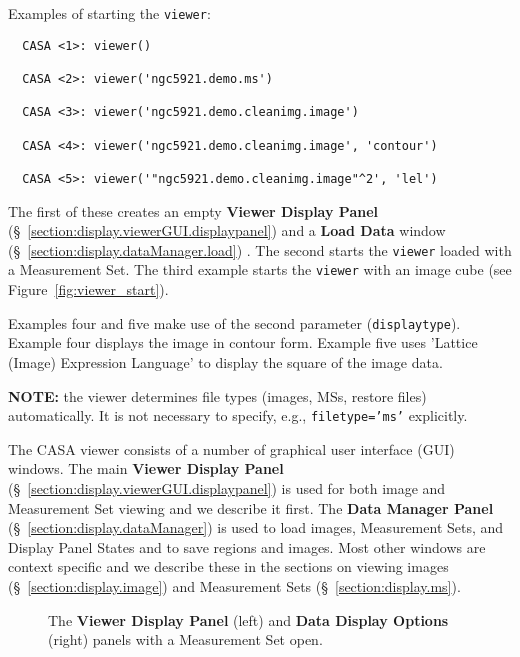 Examples of starting the {\tt viewer}:
\small
\begin{verbatim}
  CASA <1>: viewer()

  CASA <2>: viewer('ngc5921.demo.ms')

  CASA <3>: viewer('ngc5921.demo.cleanimg.image')

  CASA <4>: viewer('ngc5921.demo.cleanimg.image', 'contour')
  
  CASA <5>: viewer('"ngc5921.demo.cleanimg.image"^2', 'lel')
\end{verbatim}
\normalsize

The first of these creates an empty {\bf Viewer Display Panel} 
(\S~\ref{section:display.viewerGUI.displaypanel}) and a {\bf Load Data} 
window (\S~\ref{section:display.dataManager.load}) .  The second starts the
{\tt viewer} loaded with a Measurement Set.  The third example
starts the {\tt viewer} with an image cube (see Figure~\ref{fig:viewer_start}).  


Examples four and five make use of the second parameter ({\tt displaytype}).  Example 
four displays the image in contour form.  Example five uses 'Lattice (Image) Expression 
Language' to display the square of the image data.

{\bf NOTE:} the viewer determines file types (images, MSs, restore files) automatically.  
It is not necessary to specify, e.g., {\tt filetype='ms'} explicitly.

The CASA  viewer consists of a number of graphical user interface (GUI) windows.
The main {\bf Viewer Display Panel} (\S~\ref{section:display.viewerGUI.displaypanel})
is used for both image and Measurement Set viewing and we describe it first. The
{\bf Data Manager Panel} (\S~\ref{section:display.dataManager}) is used to load images, 
Measurement Sets, and Display Panel States and to save regions and images. Most
other windows are context specific and we describe these in the sections on viewing
images (\S~\ref{section:display.image}) and Measurement Sets (\S~\ref{section:display.ms}).

\begin{figure}[h!]
\begin{center}
\caption{\label{fig:viewer_start_ms} The {\bf Viewer Display Panel}
(left) and {\bf Data Display Options} (right) panels with a Measurement Set open.} 
\hrulefill
\end{center}
\end{figure}

